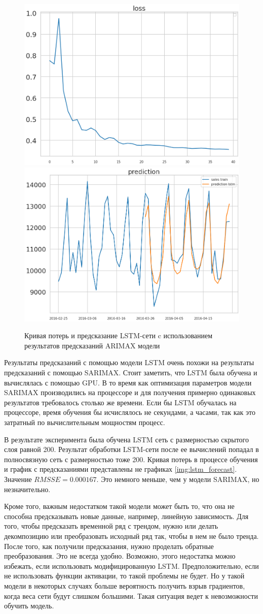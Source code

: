 \def\figurename{Рис}
\begin{figure}[t]
	\centering
	\includegraphics[width=0.4\columnwidth]{./img/lstm_with_arima_loss.png}
	\includegraphics[width=0.4\columnwidth]{./img/lstm_with_arima_prediction.png}
	\caption{Кривая потерь и предсказание LSTM-сети c использованием результатов предсказаний ARIMAX модели}
	\label{img:lstm_with_arima_forecast}
\end{figure}

Результаты предсказаний с помощью модели LSTM очень похожи на результаты предсказаний
с помощью SARIMAX. Стоит заметить, что LSTM была обучена и вычислялась с помощью GPU.
В то время как оптимизация параметров модели SARIMAX производились на процессоре и
для получения примерно одинаковых результатов требовалось столько же времени.
Если бы LSTM обучалась на процессоре, время обучения бы исчислялось не секундами, а часами,
так как это затратный по вычислительным мощностям процесс.

В результате эксперимента была обучена LSTM сеть с размерностью скрытого слоя равной 200.
Результат обработки LSTM-сети после ее вычислений попадал в полносвязную сеть с размерностью
тоже 200. Кривая потерь в процессе обучения и график с предсказаниями представлены не графиках \ref{img:lstm_forecast}.
Значение $ RMSSE = 0.000167 $. Это немного меньше, чем у модели SARIMAX, но незначительно.

Кроме того, важным недостатком такой модели может быть то, что она не
способна предсказывать новые данные, например, линейную зависимость.
Для того, чтобы предсказать временной ряд с трендом, нужно или делать
декомпозицию или преобразовать исходный ряд так, чтобы в нем не было тренда.
После того, как получили предсказания, нужно проделать обратные преобразования.
Это не всегда удобно. Возможно, этого недостатка можно избежать,
если использовать модифицированную LSTM. Предположительно, если не использовать
функции активации, то такой проблемы не будет. Но у такой модели
в некоторых случаях больше вероятность получить взрыв градиентов, когда
веса сети будут слишком большими. Такая ситуация ведет к невозможности обучить модель.


